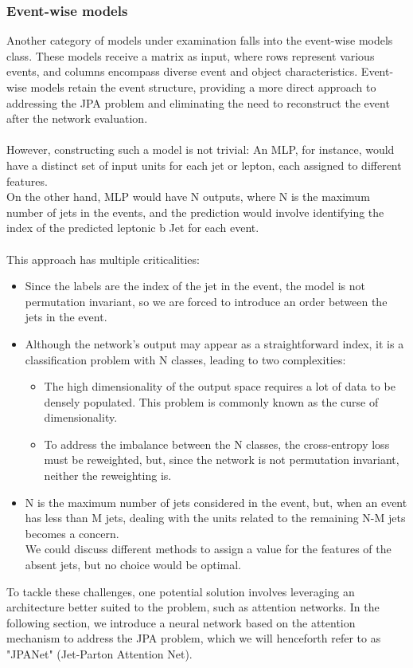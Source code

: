 \subsubsection*{Event-wise models}
Another category of models under examination falls into the event-wise models class. These models receive a matrix as input, where rows represent various events, and columns encompass diverse event and object characteristics. 
Event-wise models retain the event structure, providing a more direct approach to addressing the JPA problem and eliminating the need to reconstruct the event after the network evaluation.\\
\\
However, constructing such a model is not trivial: An MLP, for instance, would have a distinct set of input units for each jet or lepton, each assigned to different features.\\
On the other hand, MLP would have N outputs, where N is the maximum number of jets in the events, and the prediction would involve identifying the index of the predicted leptonic b Jet for each event.\\
\\
This approach has multiple criticalities:
\begin{itemize}
    \item Since the labels are the index of the jet in the event, the model is not permutation invariant, so we are forced to introduce an order between the jets in the event.
    \item Although the network's output may appear as a straightforward index, it is a classification problem with N classes, leading to two complexities:
    \begin{itemize}
        \item[\ding{111}] The high dimensionality of the output space requires a lot of data to be densely populated. This problem is commonly known as the curse of dimensionality.
        \item[\ding{111}] To address the imbalance between the N classes, the cross-entropy loss must be reweighted, but, since the network is not permutation invariant, neither the reweighting is.
    \end{itemize}
    \item N is the maximum number of jets considered in the event, but, when an event has less than M jets, dealing with the units related to the remaining N-M jets becomes a concern.\\
    We could discuss different methods to assign a value for the features of the absent jets, but no choice would be optimal.
\end{itemize}
To tackle these challenges, one potential solution involves leveraging an architecture better suited to the problem, such as attention networks. In the following section, we introduce a neural network based on the attention mechanism to address the JPA problem, which we will henceforth refer to as "JPANet" (Jet-Parton Attention Net).

